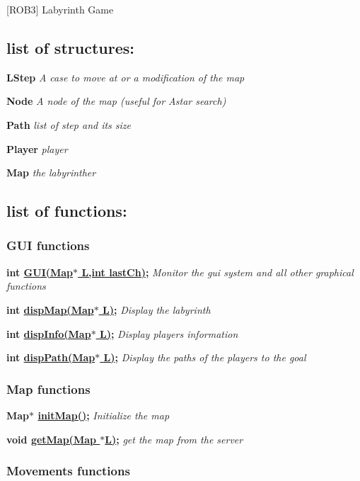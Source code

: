 \mbox{[}R\+O\+B3\mbox{]} Labyrinth Game

\subsection*{list of structures\+:}

{\bfseries L\+Step} {\itshape A case to move at or a modification of the map}

{\bfseries Node} {\itshape A node of the map (useful for Astar search)}

{\bfseries Path} {\itshape list of step and its size}

{\bfseries Player} {\itshape player}

{\bfseries Map} {\itshape the labyrinther}

\subsection*{list of functions\+:}

\subsubsection*{G\+UI functions}

{\bfseries int \hyperlink{guilib_8h_a74faad0e3c55dfd39a5ecd03e9ae60f1}{G\+U\+I(\+Map$\ast$ L,int last\+Ch)};} {\itshape Monitor the gui system and all other graphical functions}

{\bfseries int \hyperlink{guilib_8h_a82e2bf7357d16998055a8768e3632f0e}{disp\+Map(\+Map$\ast$ L)};} {\itshape Display the labyrinth}

{\bfseries int \hyperlink{guilib_8h_abbe720778f4a4bb964fb8dfacaf2e315}{disp\+Info(\+Map$\ast$ L)};} {\itshape Display players\textquotesingle{} information}

{\bfseries int \hyperlink{guilib_8h_a49ec06bbcb4afaba4ec233e5f5d0ea50}{disp\+Path(\+Map$\ast$ L)};} {\itshape Display the paths of the players to the goal}

\subsubsection*{Map functions}

{\bfseries Map$\ast$ \hyperlink{mapping_8c_a1b4990072cb0d42063abd514d5c9726c}{init\+Map()};} {\itshape Initialize the map}

{\bfseries void \hyperlink{mapping_8h_acd86842943223c3da418c5981befabf6}{get\+Map(\+Map $\ast$\+L)};} {\itshape get the map from the server} \subsubsection*{Movements functions}

